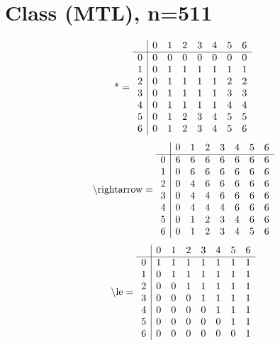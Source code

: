 \documentclass[11pt]{article}
\begin{document}
\section{Class (MTL), n=511}
\[\text{*} = 
\begin{array}{r | r r r r r r r}
 & 0 & 1 & 2 & 3 & 4 & 5 & 6 \\ \hline
0 & 0 & 0 & 0 & 0 & 0 & 0 & 0 \\
1 & 0 & 1 & 1 & 1 & 1 & 1 & 1 \\
2 & 0 & 1 & 1 & 1 & 1 & 2 & 2 \\
3 & 0 & 1 & 1 & 1 & 1 & 3 & 3 \\
4 & 0 & 1 & 1 & 1 & 1 & 4 & 4 \\
5 & 0 & 1 & 2 & 3 & 4 & 5 & 5 \\
6 & 0 & 1 & 2 & 3 & 4 & 5 & 6 \\
\end{array}
\]
\[\text{\textbackslash rightarrow} = 
\begin{array}{r | r r r r r r r}
 & 0 & 1 & 2 & 3 & 4 & 5 & 6 \\ \hline
0 & 6 & 6 & 6 & 6 & 6 & 6 & 6 \\
1 & 0 & 6 & 6 & 6 & 6 & 6 & 6 \\
2 & 0 & 4 & 6 & 6 & 6 & 6 & 6 \\
3 & 0 & 4 & 4 & 6 & 6 & 6 & 6 \\
4 & 0 & 4 & 4 & 4 & 6 & 6 & 6 \\
5 & 0 & 1 & 2 & 3 & 4 & 6 & 6 \\
6 & 0 & 1 & 2 & 3 & 4 & 5 & 6 \\
\end{array}
\]
\[\text{\textbackslash le} = 
\begin{array}{r | r r r r r r r}
 & 0 & 1 & 2 & 3 & 4 & 5 & 6 \\ \hline
0 & 1 & 1 & 1 & 1 & 1 & 1 & 1 \\
1 & 0 & 1 & 1 & 1 & 1 & 1 & 1 \\
2 & 0 & 0 & 1 & 1 & 1 & 1 & 1 \\
3 & 0 & 0 & 0 & 1 & 1 & 1 & 1 \\
4 & 0 & 0 & 0 & 0 & 1 & 1 & 1 \\
5 & 0 & 0 & 0 & 0 & 0 & 1 & 1 \\
6 & 0 & 0 & 0 & 0 & 0 & 0 & 1 \\
\end{array}
\]
\end{document}
